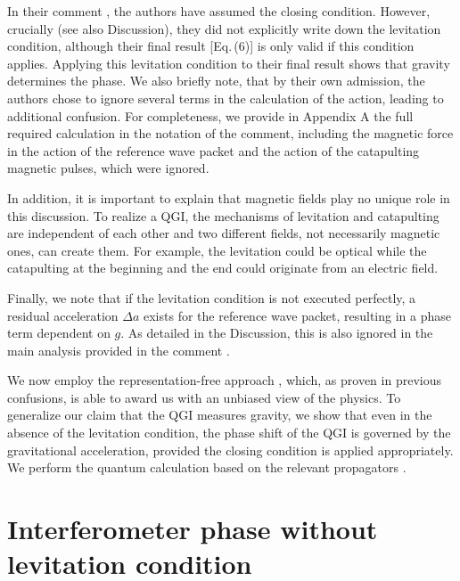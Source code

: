 \documentclass[aps,prx,onecolumn,superscriptaddress,longbibliography]{revtex4-2}
\begin{document}
In their comment \cite{QGI-comment}, the authors have assumed the closing condition. However, crucially (see also Discussion), they did not explicitly write down the levitation condition, although their final result [Eq.\,(6)] is only valid if this condition applies. Applying this levitation condition to their final result shows that gravity determines the phase. We also briefly note, that by their own admission, the authors chose to ignore several terms in the calculation of the action, leading to additional confusion. For completeness, we provide in Appendix A the full required calculation in the notation of the comment, including the magnetic force in the action of the reference wave packet and the action of the catapulting magnetic pulses, which were ignored.

In addition, it is important to explain that magnetic fields play no unique role in this discussion. To realize a QGI, the mechanisms of levitation and catapulting are independent of each other and two different fields, not necessarily magnetic ones, can create them. For example, the levitation could be optical while the catapulting at the beginning and the end could originate from an electric field.

Finally, we note that if the levitation condition is not executed perfectly, a residual acceleration $\Delta a$ exists for the reference wave packet, resulting in a phase term dependent on $g$. As detailed in the Discussion, this is also ignored in the main analysis provided in the comment \cite{QGI-comment}.

We now employ the representation-free approach \cite{Schleich-NJP,Schleich-PRL}, which, as proven in previous confusions, is able to award us with an unbiased view of the physics. To generalize our claim that the QGI measures gravity, we show that even in the absence of the levitation condition, the phase shift of the QGI is governed by the gravitational acceleration, provided the closing condition is applied appropriately. We perform the quantum calculation based on the relevant propagators \cite{T3}.


\section{Interferometer phase without levitation condition}
\end{document}
